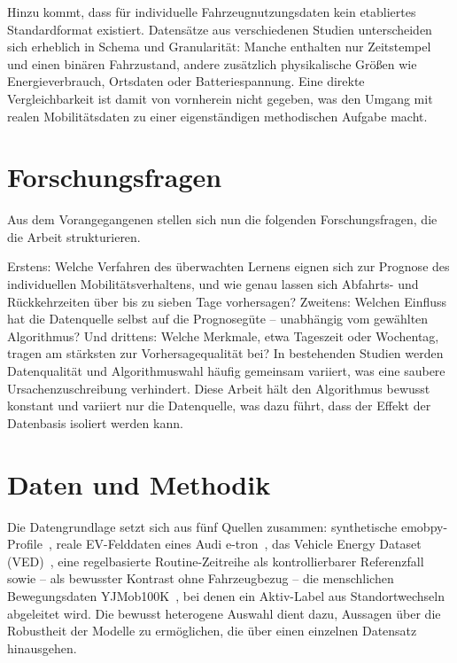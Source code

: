\documentclass[11pt,a4paper,twocolumn]{scrartcl}
\begin{document}
Hinzu kommt, dass für individuelle Fahrzeugnutzungsdaten kein etabliertes Standardformat existiert. Datensätze aus verschiedenen Studien unterscheiden sich erheblich in Schema und Granularität: Manche enthalten nur Zeitstempel und einen binären Fahrzustand, andere zusätzlich physikalische Größen wie Energieverbrauch, Ortsdaten oder Batteriespannung. Eine direkte Vergleichbarkeit ist damit von vornherein nicht gegeben, was den Umgang mit realen Mobilitätsdaten zu einer eigenständigen methodischen Aufgabe macht.

\section{Forschungsfragen}
\label{sec:forschungsfragen}

Aus dem Vorangegangenen stellen sich nun die folgenden Forschungsfragen, die die Arbeit strukturieren. 

Erstens: Welche Verfahren des überwachten Lernens eignen sich zur Prognose des individuellen Mobilitätsverhaltens, und wie genau lassen sich Abfahrts- und Rückkehrzeiten über bis zu sieben Tage vorhersagen? Zweitens: Welchen Einfluss hat die Datenquelle selbst auf die Prognosegüte -- unabhängig vom gewählten Algorithmus? Und drittens: Welche Merkmale, etwa Tageszeit oder Wochentag, tragen am stärksten zur Vorhersagequalität bei?
In bestehenden Studien werden Datenqualität und Algorithmuswahl häufig gemeinsam variiert, was eine saubere Ursachenzuschreibung verhindert. Diese Arbeit hält den Algorithmus bewusst konstant und variiert nur die Datenquelle, was dazu führt, dass der Effekt der Datenbasis isoliert werden kann.

\section{Daten und Methodik}

Die Datengrundlage setzt sich aus fünf Quellen zusammen: synthetische emobpy-Profile~\cite{gaetemorales2020emobpy}, reale EV-Felddaten eines Audi e-tron~\cite{pozzato2023fielddata}, das Vehicle Energy Dataset (VED)~\cite{oh2020ved}, eine regelbasierte Routine-Zeitreihe als kontrollierbarer Referenzfall sowie -- als bewusster Kontrast ohne Fahrzeugbezug -- die menschlichen Bewegungsdaten YJMob100K~\cite{yabe2024yjmob}, bei denen ein Aktiv-Label aus Standortwechseln abgeleitet wird. Die bewusst heterogene Auswahl dient dazu, Aussagen über die Robustheit der Modelle zu ermöglichen, die über einen einzelnen Datensatz hinausgehen.
\end{document}
